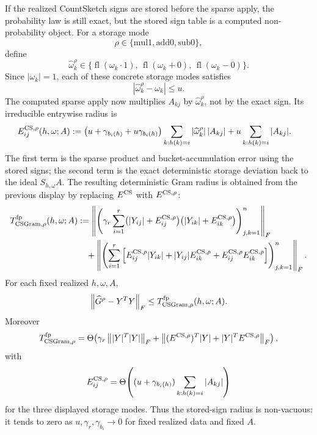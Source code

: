 \documentclass[11pt]{article}
\newcommand{\Frob}[1]{\left\lVert #1\right\rVert_F}
\newcommand{\fl}{\operatorname{fl}}
\theoremstyle{remark}
\begin{document}
If the realized CountSketch signs are stored before the sparse apply, the
probability law is still exact, but the stored sign table is a computed
non-probability object.  For a storage mode
\[
  \rho\in\{\mathrm{mul1},\mathrm{add0},\mathrm{sub0}\},
\]
define
\[
  \widehat\omega_k^\rho
  \in
  \{\fl(\omega_k\cdot1),\,\fl(\omega_k+0),\,\fl(\omega_k-0)\}.
\]
Since \(|\omega_k|=1\), each of these concrete storage modes satisfies
\[
  |\widehat\omega_k^\rho-\omega_k|\le u .
\]
The computed sparse apply now multiplies \(A_{kj}\) by
\(\widehat\omega_k^\rho\), not by the exact sign.  Its irreducible
entrywise radius is
\[
\begin{aligned}
  E^{{\rm CS},\rho}_{ij}(h,\omega;A)
  &:=
  \bigl(u+\gamma_{b_i(h)}+u\gamma_{b_i(h)}\bigr)
  \sum_{k:h(k)=i}|\widehat\omega_k^\rho|\,|A_{kj}|
  +
  u\sum_{k:h(k)=i}|A_{kj}|.
\end{aligned}
\]
The first term is the sparse product and bucket-accumulation error using the
stored signs; the second term is the exact deterministic storage deviation
back to the ideal \(S_{h,\omega}A\).  The resulting deterministic Gram radius
is obtained from the previous display by replacing \(E^{\rm CS}\) with
\(E^{{\rm CS},\rho}\):
\[
\begin{aligned}
  T_{{\rm CSGram},\rho}^{\rm fp}(h,\omega;A)
  &:=
  \Frob{
    \left(
      \gamma_r
      \sum_{i=1}^{r}
      \bigl(|Y_{ij}|+E^{{\rm CS},\rho}_{ij}\bigr)
      \bigl(|Y_{ik}|+E^{{\rm CS},\rho}_{ik}\bigr)
    \right)_{j,k=1}^{n}
  }
  \\
  &\quad+
  \Frob{
    \left(
      \sum_{i=1}^{r}
      \left[
        E^{{\rm CS},\rho}_{ij}|Y_{ik}|
        +
        |Y_{ij}|E^{{\rm CS},\rho}_{ik}
        +
        E^{{\rm CS},\rho}_{ij}E^{{\rm CS},\rho}_{ik}
      \right]
    \right)_{j,k=1}^{n}
  } .
\end{aligned}
\]
For each fixed realized \(h,\omega,A\),
\[
  \Frob{\widehat G^\rho-Y^TY}
  \le
  T_{{\rm CSGram},\rho}^{\rm fp}(h,\omega;A).
\]
Moreover
\[
  T_{{\rm CSGram},\rho}^{\rm fp}
  =
  \Theta\!\left(
    \gamma_r\Frob{|Y|^T|Y|}
    +
    \Frob{(E^{{\rm CS},\rho})^T|Y|+|Y|^TE^{{\rm CS},\rho}}
  \right),
\]
with
\[
  E^{{\rm CS},\rho}_{ij}
  =
  \Theta\!\left(
    (u+\gamma_{b_i(h)})
    \sum_{k:h(k)=i}|A_{kj}|
  \right)
\]
for the three displayed storage modes.  Thus the stored-sign radius is
non-vacuous: it tends to zero as \(u,\gamma_r,\gamma_{b_i}\to0\) for fixed
realized data and fixed \(A\).
\end{document}
